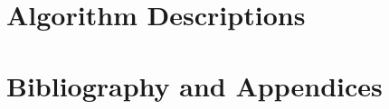 \tableofcontents

\cleardoublepage
{}
     

%
%

%

%
\part{Algorithm Descriptions}

%
%

%
%
%
%
%
% 
%
%
%
%


%
%
\part{Bibliography and Appendices}
%

%
%
%  
%  


%
%
\printindex







